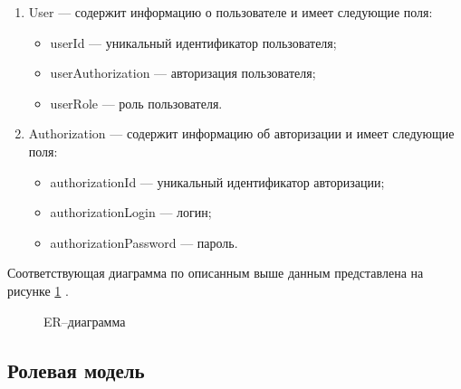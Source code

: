 \begin{enumerate}
	\item User --- содержит информацию о пользователе и имеет следующие поля:
	\begin{itemize}[label=---]
		\item userId --- уникальный идентификатор пользователя;
		\item userAuthorization --- авторизация пользователя;
		\item userRole ---  роль пользователя.
	\end{itemize}	
	
	\item Authorization --- содержит информацию об авторизации и имеет следующие поля:
	\begin{itemize}[label=---]
		\item authorizationId --- уникальный идентификатор авторизации;
		\item authorizationLogin --- логин;
		\item authorizationPassword ---  пароль.
	\end{itemize}	
\end{enumerate}

Соответствующая диаграмма по описанным выше данным представлена на рисунке \ref{fig:er} .

\begin{figure}[ht!]
	\caption{ER--диаграмма}
	\label{fig:er}
\end{figure}

\newpage


\subsection{Ролевая модель}

